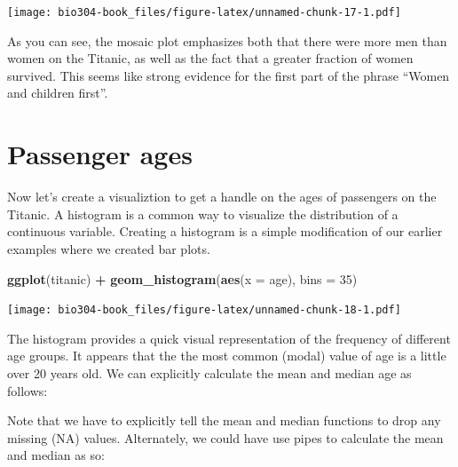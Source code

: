 \documentclass[]{book}
\newenvironment{Shaded}{\begin{snugshade}}{\end{snugshade}}
\newcommand{\CommentTok}[1]{\textcolor[rgb]{0.56,0.35,0.01}{\textit{#1}}}
\newcommand{\DataTypeTok}[1]{\textcolor[rgb]{0.13,0.29,0.53}{#1}}
\newcommand{\DecValTok}[1]{\textcolor[rgb]{0.00,0.00,0.81}{#1}}
\newcommand{\KeywordTok}[1]{\textcolor[rgb]{0.13,0.29,0.53}{\textbf{#1}}}
\newcommand{\NormalTok}[1]{#1}
\newcommand{\OperatorTok}[1]{\textcolor[rgb]{0.81,0.36,0.00}{\textbf{#1}}}
\newcommand{\OtherTok}[1]{\textcolor[rgb]{0.56,0.35,0.01}{#1}}
\newcommand{\StringTok}[1]{\textcolor[rgb]{0.31,0.60,0.02}{#1}}
\theoremstyle{definition}
\theoremstyle{definition}
\theoremstyle{definition}
\theoremstyle{remark}
\begin{document}
\texttt{[image: bio304-book\_files/figure-latex/unnamed-chunk-17-1.pdf]}

As you can see, the mosaic plot emphasizes both that there were more men
than women on the Titanic, as well as the fact that a greater fraction
of women survived. This seems like strong evidence for the first part of
the phrase ``Women and children first''.

\hypertarget{passenger-ages}{%
\section{Passenger ages}\label{passenger-ages}}

Now let's create a visualiztion to get a handle on the ages of
passengers on the Titanic. A histogram is a common way to visualize the
distribution of a continuous variable. Creating a histogram is a simple
modification of our earlier examples where we created bar plots.

\begin{Shaded}
\begin{Highlighting}[]
\KeywordTok{ggplot}\NormalTok{(titanic) }\OperatorTok{+}
\StringTok{  }\KeywordTok{geom_histogram}\NormalTok{(}\KeywordTok{aes}\NormalTok{(}\DataTypeTok{x =}\NormalTok{ age), }\DataTypeTok{bins =} \DecValTok{35}\NormalTok{)}
\end{Highlighting}
\end{Shaded}

\texttt{[image: bio304-book\_files/figure-latex/unnamed-chunk-18-1.pdf]}

The histogram provides a quick visual representation of the frequency of
different age groups. It appears that the the most common (modal) value
of age is a little over 20 years old. We can explicitly calculate the
mean and median age as follows:

\begin{Shaded}
\end{Shaded}

Note that we have to explicitly tell the mean and median functions to
drop any missing (NA) values. Alternately, we could have use pipes to
calculate the mean and median as so:
\end{document}
